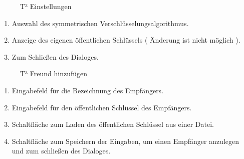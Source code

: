 \documentclass[12pt,a4paper,titlepage]{article}
\begin{document}
\begin{figure}[ht]
  \centering
  \caption{T³ Einstellungen}
  \label{t3_settingswindow}
\end{figure}
\begin{enumerate}
\item Auswahl des symmetrischen Verschlüsselungsalgorithmus.
\item Anzeige des eigenen öffentlichen Schlüssels ( Änderung ist nicht möglich ).
\item Zum Schließen des Dialoges.
\end{enumerate}
\newpage
\begin{figure}[ht]
  \centering
  \caption{T³ Freund hinzufügen}
  \label{t3_addfriendwindow}
\end{figure}
\begin{enumerate}
\item Eingabefeld für die Bezeichnung des Empfängers.
\item Eingabefeld für den öffentlichen Schlüssel des Empfängers.
\item Schaltfläche zum Laden des öffentlichen Schlüssel aus einer Datei.
\item Schaltfläche zum Speichern der Eingaben, um einen Empfänger anzulegen und zum schließen des Dialoges.
\end{enumerate}
\end{document}
